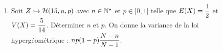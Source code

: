 \documentclass[a4paper, 11pt,reqno]{article}
\begin{document}
\begin{exercice}  \;
	\begin{enumerate}
	\item Soit $Z\hookrightarrow \mathcal{H}(15,n,p)$ avec $n\in\mathbb{N}^{\star}$ et $p\in\rbrack 0,1 \lbrack$ telle que $E(X)=\displaystyle\frac{1}{2}$ et $V(X)=\displaystyle\frac{5}{14}$. D\'eterminer $n$ et $p$. On donne la variance de la loi hyperg\'eom\'etrique : $\displaystyle np(1-p) \frac{N-n}{N-1}$.
	\end{enumerate}
\end{exercice}
\end{document}
